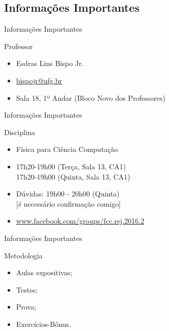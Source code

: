\documentclass[xcolor=dvipsnames,table]{beamer}
\begin{document}
	\subsection{Informações Importantes}
	\begin{frame}{Informações Importantes}
		\begin{block}{Professor}
			\begin{itemize}
				\item Esdras Lins Bispo Jr.
				\item \url{bispojr@ufg.br}
				\item Sala 18, 1º Andar (Bloco Novo dos Professores)
			\end{itemize}
		\end{block}
	\end{frame}	 
	
	\begin{frame}{Informações Importantes}
		\begin{block}{Disciplina}
			\begin{itemize}
				\item Física para Ciência Computação
				\item 17h20-19h00 (Terça, Sala 13, CA1)\\
					  17h20-19h00 (Quinta, Sala 13, CA1)
				\item Dúvidas: 19h00 - 20h00 (Quinta)\\
					  {\color{red}[é necessário confirmação comigo]}
				\item \url{www.facebook.com/groups/fcc.rej.2016.2}
			\end{itemize}
		\end{block}
	\end{frame}
	
	\begin{frame}{Informações Importantes}
		\begin{block}{Metodologia}
			\begin{itemize}
				\item Aulas expositivas;
				\item Testes;
				\item Prova;
				\item Exercícios-Bônus.
			\end{itemize}
		\end{block}
	\end{frame}
	
\end{document}
